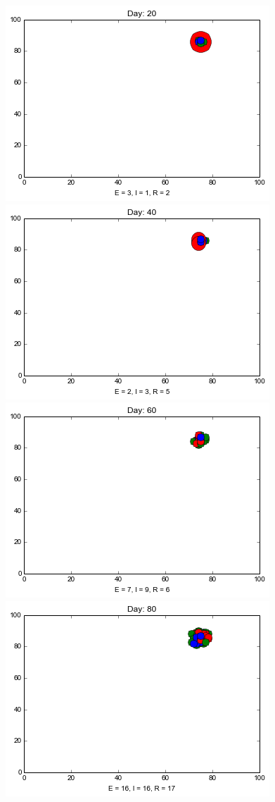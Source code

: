 \begin{minipage}{\linewidth}

\centering
\includegraphics[scale=0.28]{images/1t20.png} \quad
\includegraphics[scale=0.28]{images/1t40.png} \quad
\includegraphics[scale=0.28]{images/1t60.png} \quad
\includegraphics[scale=0.28]{images/1t80.png} 


\end{minipage}
